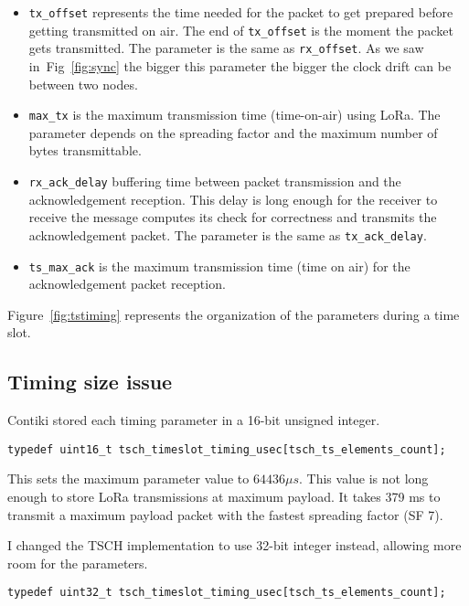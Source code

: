 \begin{itemize}
  \item \lstinline{tx_offset} represents the time needed for the packet to get
    prepared before getting transmitted on air. The end of
    \lstinline{tx_offset} is the moment the packet gets transmitted. 
    The parameter is the same as \lstinline{rx_offset}.
    As we saw in~Fig~\ref{fig:sync} the bigger this parameter the bigger the
    clock drift can be between two nodes.
  \item \lstinline{max_tx} is the maximum transmission time (time-on-air) using
    LoRa. The parameter depends on the spreading factor and the maximum number
    of bytes transmittable.
  \item \lstinline{rx_ack_delay} buffering time between packet transmission and
    the acknowledgement reception. This delay is long enough for the receiver
    to receive the message computes its check for correctness and transmits the acknowledgement packet.
    The parameter is the same as \lstinline{tx_ack_delay}.
  \item \lstinline{ts_max_ack} is the maximum transmission time (time on air) for
    the acknowledgement packet reception.
\end{itemize}

Figure~\ref{fig:tstiming} represents the organization of the parameters during
a time slot.



\subsection{Timing size issue}

Contiki stored each timing parameter in a 16-bit unsigned integer.

\begin{lstlisting}
typedef uint16_t tsch_timeslot_timing_usec[tsch_ts_elements_count];
\end{lstlisting}

This sets the maximum parameter value to $64436\mu s$.
This value is not long enough to store LoRa transmissions at maximum payload.
It takes 379 ms to transmit a maximum payload packet with the fastest spreading
factor (SF 7).

I changed the TSCH implementation to use 32-bit integer instead, allowing more
room for the parameters.

\begin{lstlisting}
typedef uint32_t tsch_timeslot_timing_usec[tsch_ts_elements_count];
\end{lstlisting}


